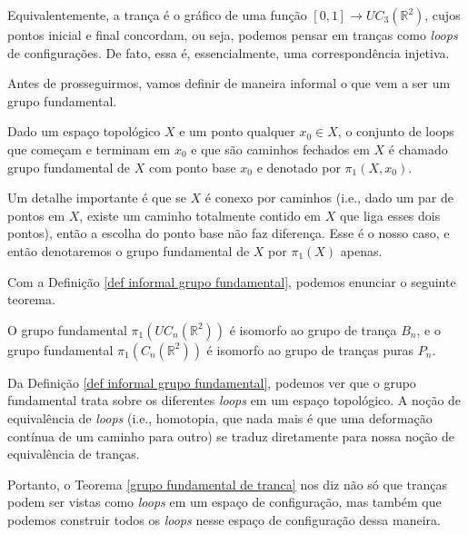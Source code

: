 	\par\vspace{0.3cm} Equivalentemente, a trança é o gráfico de uma função 
	$[0,1]\to UC_3(\mathbb{R}^2)$, cujos pontos inicial e final concordam, ou seja, 
	podemos pensar em tranças como \textit{loops} de configurações. De fato, essa é, 
	essencialmente, uma correspondência injetiva.
	
	\par\vspace{0.3cm} Antes de prosseguirmos, vamos definir de maneira informal 
	o que vem a ser um grupo fundamental.
	\medskip
	\begin{definition}
	\label{def informal grupo fundamental}
		Dado um espaço topológico $X$ e um ponto qualquer $x_0\in X$, 
		o conjunto de loops que começam e 
		terminam em $x_0$ e que são caminhos fechados em $X$ é chamado grupo fundamental de $X$ 
		com ponto base $x_0$ e denotado por $\pi_1(X,x_0)$.
	\end{definition}
	Um detalhe importante é que se $X$ é conexo por caminhos (i.e., dado um par de pontos em $X$, 
	existe um caminho totalmente contido em $X$ que liga esses dois pontos), então a escolha do 
	ponto base não faz diferença. Esse é o nosso caso, e então denotaremos o grupo fundamental 
	de $X$ por $\pi_1(X)$ apenas.
	
	\par\vspace{0.3cm} Com a Definição \ref{def informal grupo fundamental}, podemos enunciar 
	o seguinte teorema.
	\begin{theorem}
	\label{grupo fundamental de tranca}
		O grupo fundamental $\pi_1(UC_n(\mathbb{R}^2))$ é isomorfo ao grupo de trança $B_n$, 
		e o grupo fundamental $\pi_1(C_n(\mathbb{R}^2))$ é isomorfo ao grupo de tranças puras $P_n$.
	\end{theorem} 
	Da Definição \ref{def informal grupo fundamental}, podemos ver que o grupo fundamental trata 
	sobre os diferentes \textit{loops} em um espaço topológico. A noção de equivalência de 
	\textit{loops} (i.e., homotopia, que nada mais é que uma deformação contínua de um caminho 
	para outro) se traduz diretamente para nossa noção de equivalência de tranças.
	
	\par\vspace{0.3cm} Portanto, o Teorema \ref{grupo fundamental de tranca} nos diz não só 
	que tranças podem ser vistas como \textit{loops} em um espaço de configuração, mas também 
	que podemos construir todos os \textit{loops} nesse espaço de configuração dessa maneira.
	
